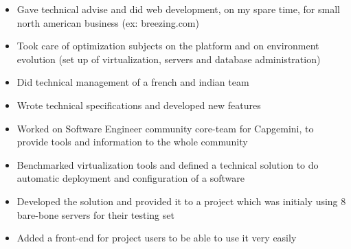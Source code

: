 \documentclass[11pt,a4paper,ragged2e]{src/altacv_1column}
\begin{document}
\cvsection{}
\begin{itemize}
\item Gave technical advise and did web development, on my spare time, for small north american business (ex: breezing.com)
\end{itemize}

\divider



\begin{itemize}
\item Took care of optimization subjects on the platform and on environment evolution (set up of virtualization, servers and database administration)
\item Did technical management of a french and indian team
\item Wrote technical specifications and developed new features
\item Worked on Software Engineer community core-team for Capgemini, to provide tools and information to the whole community
\end{itemize}

\divider


\begin{itemize}
\item Benchmarked virtualization tools and defined a technical solution to do automatic deployment and configuration of a software
\item Developed the solution and provided it to a project which was initialy using 8 bare-bone servers for their testing set
\item Added a front-end for project users to be able to use it very easily
\end{itemize}





\divider

\end{document}
